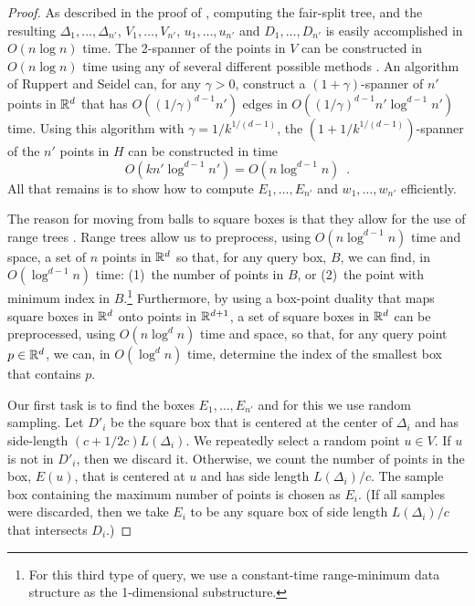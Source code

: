\documentclass{patmorin}
\begin{document}
\begin{proof}
  As described in the proof of , computing the
  fair-split tree, and the resulting $\Delta_1,\ldots,\Delta_{n'}$,
  $V_1,\ldots,V_{n'}$, $u_1,\ldots,u_{n'}$ and $D_1,\ldots,D_{n'}$
  is easily accomplished in $O(n\log n)$ time.  The 2-spanner
  of the points in $V$ can be constructed in $O(n\log
  n)$ time using any of several different possible methods
  \cite{callahan.kosaraju:faster,salowe:constructing,vaidya:sparse}.
  An algorithm of Ruppert and Seidel \cite{ruppert.seidel:approximating}
  can, for any $\gamma >0$, construct a $(1+\gamma)$-spanner of
  $n'$ points in $\mathbb{R}^d$ that has $O((1/\gamma)^{d-1}n')$ edges in
  $O((1/\gamma)^{d-1} n'\log^{d-1} n')$ time.  Using this algorithm with
  $\gamma=1/k^{1/(d-1)}$, the $(1+1/k^{1/(d-1)})$-spanner of the $n'$
  points in $H$ can be constructed in time
  \[
     O(kn'\log^{d-1} n') = O(n\log^{d-1} n) \enspace .
  \]
  All that remains is to show how to compute $E_1,\ldots,E_{n'}$ and
  $w_1,\ldots,w_{n'}$ efficiently.

  The reason for moving from balls to square boxes is that they allow for
  the use of range trees \cite{bentley:multidimensional,luecker:data}.
  Range trees allow us to preprocess, using $O(n\log^{d-1} n)$ time and
  space, a set of $n$ points in $\mathbb{R}^d$ so that, for any query box, $B$,
  we can find, in $O(\log^{d-1} n)$ time: (1)~the number of points in $B$,
  or (2)~the point with minimum index in $B$.\footnote{For this third
  type of query, we use a constant-time range-minimum data structure
  \cite{bender.farach-colton:lca} as the 1-dimensional substructure.}
  Furthermore, by using a box-point duality that maps square boxes in
  $\mathbb{R}^d$ onto points in $\mathbb{R}^{d+1}$, a set of square boxes in $\mathbb{R}^d$
  can be preprocessed, using $O(n\log^d n)$ time and space, so that, for
  any query point $p\in\mathbb{R}^d$, we can, in $O(\log^d n)$ time, determine
  the index of the smallest box that contains $p$.

  Our first task is to find the boxes $E_1,\ldots,E_{n'}$ and for
  this we use random sampling.  Let $D'_{i}$ be the square box
  that is centered at the center of $\Delta_i$ and has side-length
  $(c+1/2c)L(\Delta_i)$.  We repeatedly select a random point $u\in V$.
  If $u$ is not in $D'_i$, then we discard it.  Otherwise, we count the
  number of points in the box, $E(u)$, that is centered at $u$ and has
  side length $L(\Delta_i)/c$.  The sample box containing the maximum
  number of points is chosen as $E_i$.  (If all samples were discarded,
  then we take $E_i$ to be any square box of side length $L(\Delta_i)/c$
  that intersects $D_i$.)


\end{proof}
\end{document}

